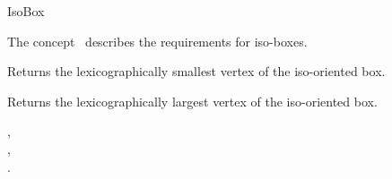 

\begin{ccRefConcept}{IsoBox}


\ccDefinition
  
The concept \ccRefName\ describes the requirements for iso-boxes.


\ccTypes


\ccCreation
{}  %


\ccOperations

{Returns the lexicographically smallest vertex of the iso-oriented box.}


{Returns the  lexicographically largest vertex of the iso-oriented box.}


\ccHasModels

,\\
,\\
.

\end{ccRefConcept}


